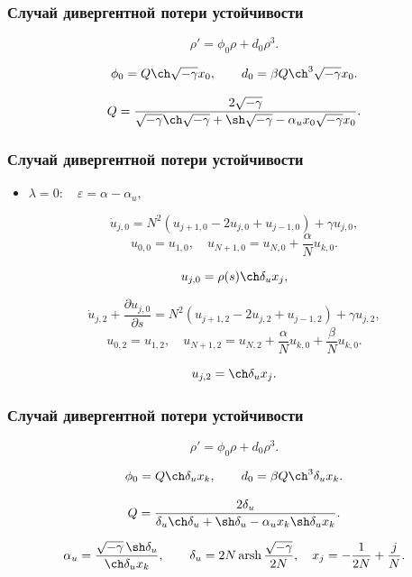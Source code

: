 \documentclass[fullscreen=true, unicode, bookmarks=false]{beamer}
\DeclareMathOperator{\arsh}{arsh}
\begin{document}
\begin{frame}
\frametitle{ Случай дивергентной потери устойчивости }

$$
\rho' = \phi_0 \rho + d_0 \rho^3.
$$

\vfill

$$ \phi_0 = Q \ch \sqrt{-\gamma} x_0, \qquad d_0 = \beta Q \ch^3 \sqrt{-\gamma} x_0. $$

$$ Q = \frac{2\sqrt{-\gamma}}{\sqrt{-\gamma}\ch\sqrt{-\gamma} + \sh\sqrt{-\gamma} - \alpha_u x_0 \sqrt{-\gamma} x_0}. $$

\end{frame}

\begin{frame}
\frametitle{ Случай дивергентной потери устойчивости }

\begin{itemize}
\item { $ \lambda = 0: \quad \varepsilon=\alpha-\alpha_u, $
}
\end{itemize}

$$
\dot u_{j,0} = N^2(u_{j+1,0} - 2u_{j,0} + u_{j-1,0}) + \gamma u_{j,0},
$$
$$
u_{0,0} = u_{1,0}, \quad u_{N+1,0} = u_{N,0} + \dfrac{\alpha}{N}u_{k,0}.
$$

\vfill

$$ u_{j,0} = \rho(s) \ch \delta_u x_j, $$

$$
\dot u_{j,2} + \frac{\partial u_{j,0}}{\partial s} = N^2(u_{j+1,2} - 2u_{j,2} + u_{j-1,2}) + \gamma u_{j,2},
$$
$$
u_{0,2} = u_{1,2}, \quad u_{N+1,2} = u_{N,2} + \dfrac{\alpha}{N}u_{k,0} + \dfrac{\beta}{N}u_{k,0}.
$$

\vfill

$$ u_{j,2} = \ch \delta_u x_j. $$

\end{frame}

\begin{frame}
\frametitle{ Случай дивергентной потери устойчивости }

$$ \rho' = \phi_0 \rho + d_0 \rho^3. $$

\vfill

$$ \phi_0 = Q \ch \delta_u x_k, \qquad d_0 = \beta Q \ch^3 \delta_u x_k. $$

$$ Q = \frac{2 \delta_u}{\delta_u\ch \delta_u + \sh \delta_u - \alpha_u x_k \sh \delta_u x_k}. $$

\vfill

$$ \alpha_u = \frac{ \sqrt{-\gamma} \, \sh \delta_u }{ \ch\delta_u x_k }, \qquad \delta_u = 2N \arsh \dfrac{\sqrt{-\gamma}}{2N}, \quad x_j = -\dfrac{1}{2N} + \dfrac{j}{N}. $$

\end{frame}
\end{document}
